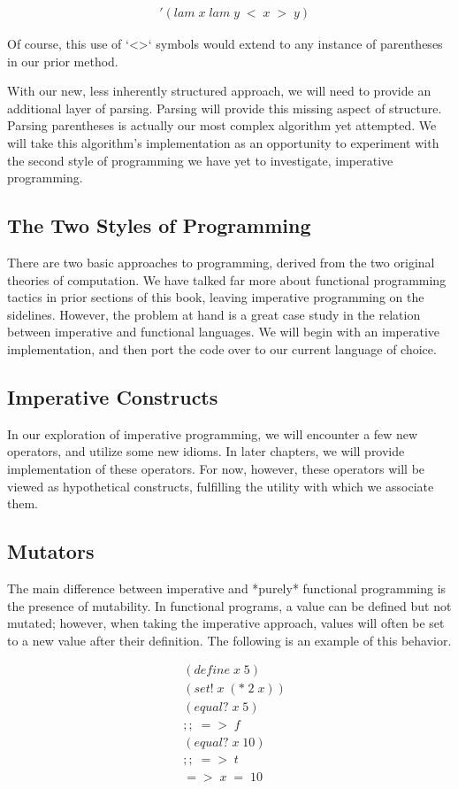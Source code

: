 \documentclass[11pt]{article}
\begin{document}
\begin{align*}
& '(lam \; x \; lam \; y \; < \; x \; > \; y)
\end{align*}

Of course, this use of `<>` symbols would extend to any instance of parentheses in our prior method.

With our new, less inherently structured approach, we will need to provide an additional layer of parsing. Parsing will provide this missing aspect of structure. Parsing parentheses is actually our most complex algorithm yet attempted. We will take this algorithm's implementation as an opportunity to experiment with the second style of programming we have yet to investigate, imperative programming.

\subsection{The Two Styles of Programming}
There are two basic approaches to programming, derived from the two original theories of computation. We have talked far more about functional programming tactics in prior sections of this book, leaving imperative programming on the sidelines. However, the problem at hand is a great case study in the relation between imperative and functional languages. We will begin with an imperative implementation, and then port the code over to our current language of choice.

\subsection{Imperative Constructs}
In our exploration of imperative programming, we will encounter a few new operators, and utilize some new idioms. In later chapters, we will provide implementation of these operators. For now, however, these operators will be viewed as hypothetical constructs, fulfilling the utility with which we associate them.

\subsection{Mutators}
The main difference between imperative and *purely* functional programming is the presence of mutability. In functional programs, a value can be defined but not mutated; however, when taking the imperative approach, values will often be set to a new value after their definition. The following is an example of this behavior.

\begin{align*}
& (define \; x \; 5)
\\& (set! \; x \; (* \; 2 \; x))
\\& (equal? \; x \; 5)
\\& ;; \; => \; f
\\& (equal? \; x \; 10)
\\& ;; \; => \; t
\\& => \; x \; = \; 10
\end{align*}
\end{document}
